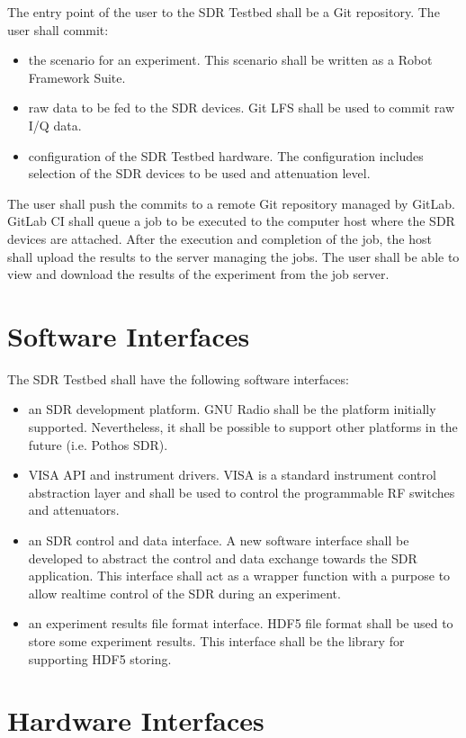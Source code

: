 \documentclass[english,titlepage,a4paper]{report}
\begin{document}
The entry point of the user to the SDR Testbed shall be a Git repository.
The user shall commit:
\begin{itemize}
\item the scenario for an experiment.
  This scenario shall be written as a Robot Framework Suite.
\item raw data to be fed to the SDR devices.
  Git LFS shall be used to commit raw I/Q data.
\item configuration of the SDR Testbed hardware.
  The configuration includes selection of the SDR devices to be used and attenuation level.
\end{itemize}
The user shall push the commits to a remote Git repository managed by GitLab.
GitLab CI shall queue a job to be executed to the computer host where the SDR devices are attached.
After the execution and completion of the job, the host shall upload the results to the server managing the jobs.
The user shall be able to view and download the results of the experiment from the job server.

\section{Software Interfaces}

The SDR Testbed shall have the following software interfaces:
\begin{itemize}
\item an SDR development platform.
  GNU Radio shall be the platform initially supported.
  Nevertheless, it shall be possible to support other platforms in the future (i.e. Pothos SDR).
\item VISA API and instrument drivers.
  VISA is a standard instrument control abstraction layer and shall be used to control the programmable RF switches and attenuators.
\item an SDR control and data interface.
  A new software interface shall be developed to abstract the control and data exchange towards the SDR application.
  This interface shall act as a wrapper function with a purpose to allow realtime control of the SDR during an experiment.
\item an experiment results file format interface.
  HDF5 file format shall be used to store some experiment results.
  This interface shall be the library for supporting HDF5 storing.
\end{itemize}

\section{Hardware Interfaces}
\end{document}
